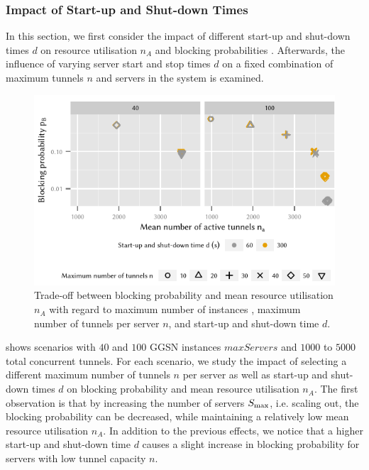 \subsubsection*{Impact of Start-up and Shut-down Times}\label{sec:cloud_virtualized_network_functions:startup_shutdown}

In this section, we first consider the impact of different start-up and shut-down times \(d\) on resource utilisation \(n_A\) and blocking probabilities \blockingprobability.
Afterwards, the influence of varying server start and stop times \(d\) on a fixed combination of maximum tunnels \(n\) and servers \maxServers in the system is examined.

\begin{figure}
  \centering
  \includegraphics{cloud/virtualized_network_functions/performance_evaluation/figures/compare_util_block}
  \caption{Trade-off between blocking probability \blockingprobability and mean resource utilisation \(n_A\) with regard to maximum number of instances \maxServers, maximum number of tunnels per server \(n\), and start-up and shut-down time \(d\).}
  \label{fig:cloud_virtualized_network_functions:startup_shutdown:compare_util_block}
\end{figure}

 shows scenarios with \(40\) and \(100\) \gls{GGSN} instances \(maxServers\) and  \(1000\) to \(5000\) total concurrent tunnels.
For each scenario, we study the impact of selecting a different maximum number of tunnels \(n\) per server as well as start-up and shut-down times \(d\) on blocking probability \blockingprobability and mean resource utilisation \(n_A\).
The first observation is that by increasing the number of servers \(S_{\max}\), i.e. scaling out, the blocking probability \blockingprobability can be decreased, while maintaining a relatively low mean resource utilisation \(n_A\).
In addition to the previous effects, we notice that a higher start-up and shut-down time \(d\) causes a slight increase in blocking probability \blockingprobability for servers with low tunnel capacity \(n\).

